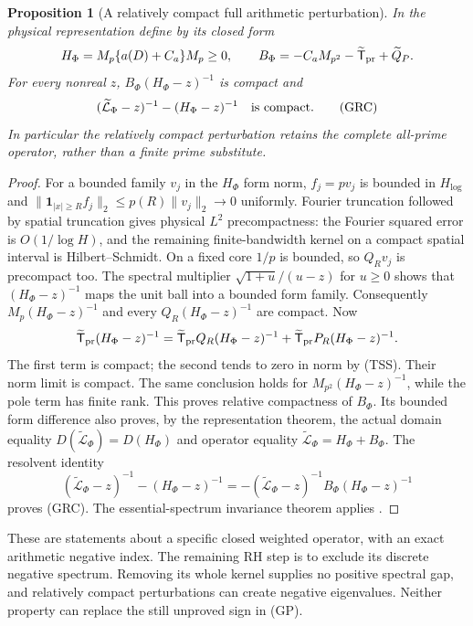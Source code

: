 \documentclass[11pt]{article}
\newtheorem{proposition}[theorem]{Proposition}
\theoremstyle{remark}\newtheorem{remark}[theorem]{Remark}
\begin{document}
\begin{proposition}[A relatively compact full arithmetic perturbation]
\label{prop:theta-relative-compact}
In the physical representation define by its closed form
\[
 H_\Phi=M_p\{a(D)+C_a\}M_p\ge0,\qquad
 B_\Phi=-C_aM_{p^2}-\widetilde{\mathsf T}_{\rm pr}
                                      +\widetilde Q_P.
\]
For every nonreal $z$, $B_\Phi(H_\Phi-z)^{-1}$ is compact and
\[
 (\widetilde{\mathcal L}_\Phi-z)^{-1}
                       -(H_\Phi-z)^{-1}\quad\hbox{is compact}. \tag{GRC}
\]
In particular the relatively compact perturbation retains the
complete all-prime operator, rather than a finite prime substitute.
\end{proposition}
\begin{proof}
For a bounded family $v_j$ in the $H_\Phi$ form norm,
$f_j=pv_j$ is bounded in $H_{\log}$ and
$\|\mathbf1_{|x|\ge R}f_j\|_2\le p(R)\|v_j\|_2\to0$
uniformly. Fourier truncation followed by spatial truncation
gives physical $L^2$ precompactness: the Fourier squared error
is $O(1/\log H)$, and the remaining finite-bandwidth kernel on
a compact spatial interval is Hilbert--Schmidt.
On a fixed core $1/p$ is bounded, so $Q_Rv_j$ is precompact too.
The spectral multiplier $\sqrt{1+u}/(u-z)$ for $u\ge0$ shows
that $(H_\Phi-z)^{-1}$ maps the unit ball into a bounded form
family. Consequently $M_p(H_\Phi-z)^{-1}$ and every
$Q_R(H_\Phi-z)^{-1}$ are compact. Now
\[
 \widetilde{\mathsf T}_{\rm pr}(H_\Phi-z)^{-1}
 =\widetilde{\mathsf T}_{\rm pr}Q_R(H_\Phi-z)^{-1}
  +\widetilde{\mathsf T}_{\rm pr}P_R(H_\Phi-z)^{-1}.
\]
The first term is compact; the second tends to zero in norm
by (TSS). Their norm limit is compact. The same conclusion
holds for $M_{p^2}(H_\Phi-z)^{-1}$, while the pole term has
finite rank. This proves relative compactness of $B_\Phi$.
Its bounded form difference also proves, by the representation
theorem, the actual domain equality
$D(\widetilde{\mathcal L}_\Phi)=D(H_\Phi)$ and operator equality
$\widetilde{\mathcal L}_\Phi=H_\Phi+B_\Phi$.
The resolvent identity
\[
 (\widetilde{\mathcal L}_\Phi-z)^{-1}-(H_\Phi-z)^{-1}
 =-(\widetilde{\mathcal L}_\Phi-z)^{-1}B_\Phi(H_\Phi-z)^{-1}
\]
proves (GRC). The essential-spectrum invariance theorem applies
\cite[Theorem 6.19, pp.~146--147]{TeschlQM2009}.
\end{proof}

These are statements about a specific closed weighted operator,
with an exact arithmetic negative index. The remaining RH step
is to exclude its discrete negative spectrum. Removing its
whole kernel supplies no positive spectral gap, and relatively
compact perturbations can create negative eigenvalues. Neither
property can replace the still unproved sign in (GP).
\end{document}
